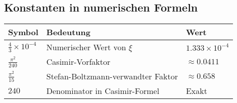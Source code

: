 \documentclass[12pt,a4paper]{article}
\begin{document}
	\subsection{Konstanten in numerischen Formeln}
	\begin{longtable}{p{2.5cm} p{10cm} p{3cm}}
		\toprule
		\textbf{Symbol} & \textbf{Bedeutung} & \textbf{Wert} \\
		\midrule
		$\frac{4}{3} \times 10^{-4}$ & Numerischer Wert von $\xi$ & $1.333 \times 10^{-4}$ \\
		$\frac{\pi^2}{240}$ & Casimir-Vorfaktor & $\approx 0.0411$ \\
		$\frac{\pi^2}{15}$ & Stefan-Boltzmann-verwandter Faktor & $\approx 0.658$ \\
		$240$ & Denominator in Casimir-Formel & Exakt \\
		\bottomrule
	\end{longtable}
	
\end{document}
